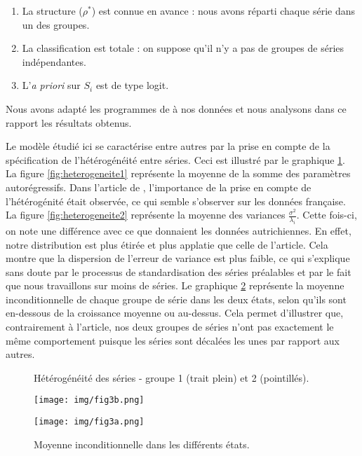 \documentclass[10pt,french,french]{article}
\begin{document}
\begin{enumerate}
\def\labelenumi{\arabic{enumi}.}
\item
  La structure (\(\rho^*\)) est connue en avance : nous avons réparti chaque série dans un des groupes.
\item
  La classification est totale : on suppose qu'il n'y a pas de groupes de séries indépendantes.
\item
  L'\emph{a priori} sur \(S_i\) est de type logit.
\end{enumerate}

Nous avons adapté les programmes de \cite{Kaufmann} à nos données et nous analysons dans ce rapport les résultats obtenus.

Le modèle étudié ici se caractérise entre autres par la prise en compte de la spécification de l'hétérogénéité entre séries.
Ceci est illustré par le graphique \ref{heterogeneite}.
La figure \ref{fig:heterogeneite1} représente la moyenne de la somme des paramètres autorégressifs.
Dans l'article de \cite{Kaufmann}, l'importance de la prise en compte de l'hétérogénité était observée, ce qui semble s'observer sur les données française.
La figure \ref{fig:heterogeneite2} représente la moyenne des variances \(\frac{\sigma^2}{\lambda_i}\).
Cette fois-ci, on note une différence avec ce que donnaient les données autrichiennes.
En effet, notre distribution est plus étirée et plus applatie que celle de l'article.
Cela montre que la dispersion de l'erreur de variance est plus faible, ce qui s'explique sans doute par le processus de standardisation des séries préalables et par le fait que nous travaillons sur moins de séries.
Le graphique \ref{etats} représente la moyenne inconditionnelle de chaque groupe de série dans les deux états, selon qu'ils sont en-dessous de la croissance moyenne ou au-dessus.
Cela permet d'illustrer que, contrairement à l'article, nos deux groupes de séries n'ont pas exactement le même comportement puisque les séries sont décalées les unes par rapport aux autres.

\begin{figure}
\caption{Hétérogénéité des séries - groupe 1 (trait plein) et 2 (pointillés).}
\label{heterogeneite}
\end{figure}

\begin{figure}
\begin{minipage}{.5\textwidth}
\texttt{[image: img/fig3b.png]}
\end{minipage}
\hfill
\begin{minipage}{.5\textwidth}
\texttt{[image: img/fig3a.png]}
\end{minipage}
\caption{Moyenne inconditionnelle dans les différents états.}
\label{etats}
\end{figure}
\end{document}
